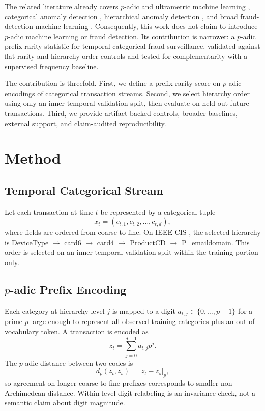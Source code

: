 \documentclass[journal]{IEEEtran}
\begin{document}
The related literature already covers $p$-adic and ultrametric machine learning \cite{khrennikov2023padicdbn,padicboltzmann2023,ultrametriccommittee2012}, categorical anomaly detection \cite{akoglu2019categorical}, hierarchical anomaly detection \cite{tuli2021hierarchical}, and broad fraud-detection machine learning \cite{bhattacharyya2016survey,carcillo2021fraudagenda,mangalathu2021explainablefraud}. Consequently, this work does not claim to introduce $p$-adic machine learning or fraud detection. Its contribution is narrower: a $p$-adic prefix-rarity statistic for temporal categorical fraud surveillance, validated against flat-rarity and hierarchy-order controls and tested for complementarity with a supervised frequency baseline.

The contribution is threefold. First, we define a prefix-rarity score on $p$-adic encodings of categorical transaction streams. Second, we select hierarchy order using only an inner temporal validation split, then evaluate on held-out future transactions. Third, we provide artifact-backed controls, broader baselines, external support, and claim-audited reproducibility.

\section{Method}
\subsection{Temporal Categorical Stream}
Let each transaction at time $t$ be represented by a categorical tuple
\begin{equation}
  x_t = (c_{t,1}, c_{t,2}, \ldots, c_{t,d}),
\end{equation}
where fields are ordered from coarse to fine. On IEEE-CIS \cite{ieeecis2019}, the selected hierarchy is DeviceType $\rightarrow$ card6 $\rightarrow$ card4 $\rightarrow$ ProductCD $\rightarrow$ P\_emaildomain. This order is selected on an inner temporal validation split within the training portion only.

\subsection{$p$-adic Prefix Encoding}
Each category at hierarchy level $j$ is mapped to a digit $a_{t,j}\in\{0,\ldots,p-1\}$ for a prime $p$ large enough to represent all observed training categories plus an out-of-vocabulary token. A transaction is encoded as
\begin{equation}
  z_t = \sum_{j=0}^{d-1} a_{t,j}p^j.
\end{equation}
The $p$-adic distance between two codes is
\begin{equation}
  d_p(z_t,z_s)=|z_t-z_s|_p,
\end{equation}
so agreement on longer coarse-to-fine prefixes corresponds to smaller non-Archimedean distance. Within-level digit relabeling is an invariance check, not a semantic claim about digit magnitude.
\end{document}
